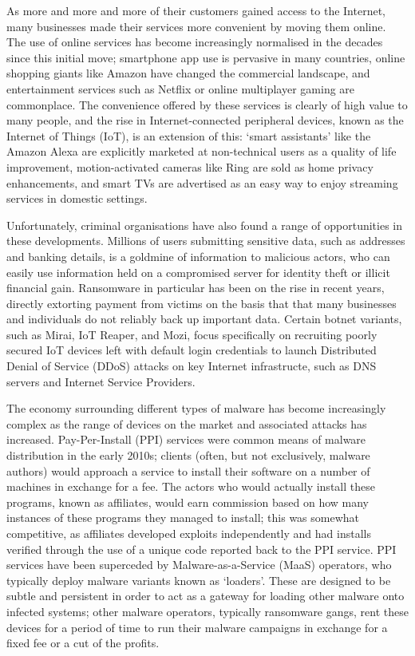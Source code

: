 \documentclass[10pt,sigconf]{acmart}
\begin{document}
As more and more and more of their customers gained access to the Internet, many businesses made their services more convenient by moving them online.
The use of online services has become increasingly normalised in the decades since this initial move;
smartphone app use is pervasive in many countries, online shopping giants like Amazon have changed the commercial landscape, and entertainment services such as Netflix or online multiplayer gaming are commonplace.
The convenience offered by these services is clearly of high value to many people, and the rise in Internet-connected peripheral devices, known as the Internet of Things (IoT), is an extension of this:
`smart assistants' like the Amazon Alexa are explicitly marketed at non-technical users as a quality of life improvement, motion-activated cameras like Ring are sold as home privacy enhancements, and smart TVs are advertised as an easy way to enjoy streaming services in domestic settings.

Unfortunately, criminal organisations have also found a range of opportunities in these developments.
Millions of users submitting sensitive data, such as addresses and banking details, is a goldmine of information to malicious actors, who can easily use information held on a compromised server for identity theft or illicit financial gain.
Ransomware in particular has been on the rise in recent years, directly extorting payment from victims on the basis that that many businesses and individuals do not reliably back up important data.
Certain botnet variants, such as Mirai, IoT Reaper, and Mozi, focus specifically on recruiting poorly secured IoT devices left with default login credentials to launch Distributed Denial of Service (DDoS) attacks on key Internet infrastructe, such as DNS servers and Internet Service Providers.

The economy surrounding different types of malware has become increasingly complex as the range of devices on the market and associated attacks has increased.
Pay-Per-Install (PPI) services were common means of malware distribution in the early 2010s;
clients (often, but not exclusively, malware authors) would approach a service to install their software on a number of machines in exchange for a fee.
The actors who would actually install these programs, known as affiliates, would earn commission based on how many instances of these programs they managed to install;
this was somewhat competitive, as affiliates developed exploits independently and had installs verified through the use of a unique code reported back to the PPI service.
PPI services have been superceded by Malware-as-a-Service (MaaS) operators, who typically deploy malware variants known as `loaders'.
These are designed to be subtle and persistent in order to act as a gateway for loading other malware onto infected systems;
other malware operators, typically ransomware gangs, rent these devices for a period of time to run their malware campaigns in exchange for a fixed fee or a cut of the profits.
\end{document}
